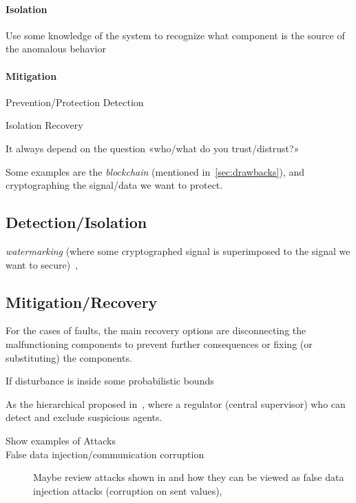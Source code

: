 \documentclass[../main.tex]{subfiles}
\begin{document}
\paragraph{Isolation}
Use some  knowledge of the system to recognize what component is the source of the anomalous behavior

\paragraph{Mitigation}





Prevention/Protection
Detection

Isolation
Recovery

It always depend on the question «who/what do you trust/distrust?»

Some examples are the \emph{blockchain} (mentioned in~\ref{sec:drawbacks}), and cryptographing the signal/data we want to protect.

\subsection{Detection/Isolation}
\emph{watermarking} (where some cryptographed signal is superimposed to the signal we want to secure)~\cite{MoEtAl2015,SatchidanandanKumar2017,KshetriVoas2017,LuciaEtAl2021},
\cite{FortiEtAl2016}

\subsection{Mitigation/Recovery}
For the cases of faults, the main recovery options are disconnecting the malfunctioning components to prevent further consequences or fixing (or substituting) the components.

If disturbance is inside some probabilistic bounds \cite{AnandutaEtAl2020}



As the hierarchical proposed in~\cite{BraunEtAl2020}, where a regulator (central supervisor) who can detect and exclude suspicious agents.


\begin{description}
  \item[Show examples of Attacks]
  \item[False data injection/communication corruption] Maybe review attacks shown in \cite{VelardeEtAl2017} and how they can be viewed as false data injection attacks (corruption on sent values), 
\end{description}
\end{document}
